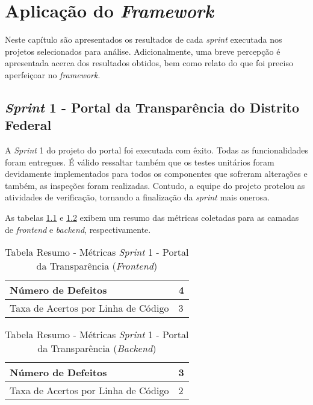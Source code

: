 \chapter{Aplicação do \textit{Framework}}

Neste capítulo são apresentados os resultados de cada \textit{sprint} executada nos projetos selecionados para análise. Adicionalmente, uma breve percepção é apresentada acerca dos resultados obtidos, bem como relato do que foi preciso aperfeiçoar no \textit{framework}.

\section{\textit{Sprint} 1 - Portal da Transparência do Distrito Federal}

A \textit{Sprint} 1 do projeto do portal foi executada com êxito. Todas as funcionalidades foram entregues. É válido ressaltar também que os testes unitários foram devidamente implementados para todos os componentes que sofreram alterações e também, as inspeções foram realizadas. Contudo, a equipe do projeto protelou as atividades de verificação, tornando a finalização da \textit{sprint} mais onerosa.

As tabelas \ref{table:tabela2} e \ref{table:tabela3} exibem um resumo das métricas coletadas para as camadas de \textit{frontend} e \textit{backend}, respectivamente.

\begin{table}[h]
\centering
\begin{tabular}{ | m{8cm} | m{8cm} | } 
\hline
Número de Defeitos & 4 \\ 
\hline
Taxa de Acertos por Linha de Código & 3 \\ 
\hline
\end{tabular}
\caption{Tabela Resumo - Métricas \textit{Sprint} 1 - Portal da Transparência (\textit{Frontend})}
\label{table:tabela2}
\end{table}

\begin{table}[h]
\centering
\begin{tabular}{ | m{8cm} | m{8cm} | } 
\hline
Número de Defeitos & 3 \\ 
\hline
Taxa de Acertos por Linha de Código & 2 \\ 
\hline
\end{tabular}
\caption{Tabela Resumo - Métricas \textit{Sprint} 1 - Portal da Transparência (\textit{Backend})}
\label{table:tabela3}
\end{table}

